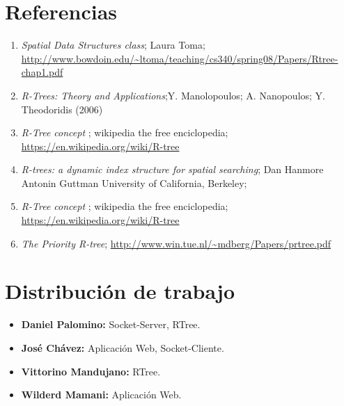 \documentclass[12pt]{article}
\begin{document}
\section*{Referencias}  %
\begin{enumerate}
\item  {\it Spatial Data Structures class}; Laura Toma; \\
\small{\url{http://www.bowdoin.edu/~ltoma/teaching/cs340/spring08/Papers/Rtree-chap1.pdf}}
\item {\it R-Trees: Theory and Applications};Y. Manolopoulos; A. Nanopoulos; Y. Theodoridis (2006) 
\item  {\it R-Tree concept }; wikipedia the free enciclopedia; 
\small{\url{https://en.wikipedia.org/wiki/R-tree}}
\item  {\it R-trees: a dynamic index structure for spatial searching}; Dan Hanmore 	Antonin Guttman 	University of California, Berkeley; 
\item  {\it R-Tree concept }; wikipedia the free enciclopedia; 
\small{\url{https://en.wikipedia.org/wiki/R-tree}}
\item {\it The Priority R-tree}; \url{http://www.win.tue.nl/~mdberg/Papers/prtree.pdf}
\end{enumerate}


\section*{Distribución de trabajo} %

\begin{itemize}
\item \textbf{Daniel Palomino:}  Socket-Server, RTree.
\item \textbf{José Chávez:}  Aplicación Web, Socket-Cliente.
\item \textbf{Vittorino Mandujano:}  RTree.
\item \textbf{Wilderd Mamani:}  Aplicación Web.
\end{itemize}
\end{document}
